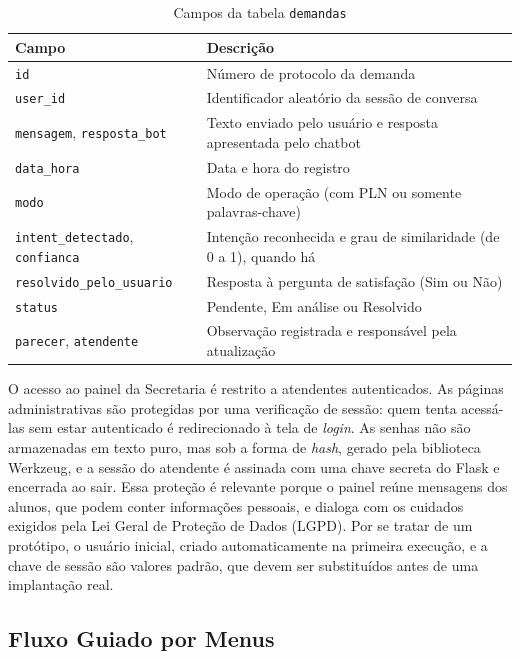 \documentclass[12pt]{article}
\begin{document}
\begin{table}[H]
  \centering
  \begin{tabular}{|p{}|p{}|}
    \hline
    \textbf{Campo} & \textbf{Descrição} \\ \hline
    \texttt{id} & Número de protocolo da demanda \\ \hline
    \texttt{user\_id} & Identificador aleatório da sessão de conversa \\ \hline
    \texttt{mensagem}, \texttt{resposta\_bot} & Texto enviado pelo usuário e
    resposta apresentada pelo chatbot \\ \hline
    \texttt{data\_hora} & Data e hora do registro \\ \hline
    \texttt{modo} & Modo de operação (com PLN ou somente palavras-chave) \\ \hline
    \texttt{intent\_detectado}, \texttt{confianca} & Intenção reconhecida e
    grau de similaridade (de 0 a 1), quando há \\ \hline
    \texttt{resolvido\_pelo\_usuario} & Resposta à pergunta de satisfação (Sim
    ou Não) \\ \hline
    \texttt{status} & Pendente, Em análise ou Resolvido \\ \hline
    \texttt{parecer}, \texttt{atendente} & Observação registrada e responsável
    pela atualização \\ \hline
  \end{tabular}
  \caption{Campos da tabela \texttt{demandas}}
  \label{tab:demandas}
\end{table}

O acesso ao painel da Secretaria é restrito a atendentes autenticados. As
páginas administrativas são protegidas por uma verificação de sessão: quem
tenta acessá-las sem estar autenticado é redirecionado à tela de \textit{login}.
As senhas não são armazenadas em texto puro, mas sob a forma de \textit{hash},
gerado pela biblioteca Werkzeug, e a sessão do atendente é assinada com uma
chave secreta do Flask e encerrada ao sair. Essa proteção é relevante porque o
painel reúne mensagens dos alunos, que podem conter informações pessoais, e
dialoga com os cuidados exigidos pela Lei Geral de Proteção de Dados (LGPD).
Por se tratar de um protótipo, o usuário inicial, criado automaticamente na
primeira execução, e a chave de sessão são valores padrão, que devem ser
substituídos antes de uma implantação real.

\subsection{Fluxo Guiado por Menus}
\end{document}
